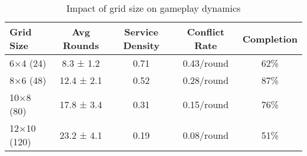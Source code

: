 \begin{table}[h]
\centering
\caption{Impact of grid size on gameplay dynamics}
\label{tab:gridsize}
\begin{tabular}{@{}lcccc@{}}
\toprule
Grid Size & Avg Rounds & Service Density & Conflict Rate & Completion \\
\midrule
6×4 (24) & 8.3 ± 1.2 & 0.71 & 0.43/round & 62\% \\
8×6 (48) & 12.4 ± 2.1 & 0.52 & 0.28/round & 87\% \\
10×8 (80) & 17.8 ± 3.4 & 0.31 & 0.15/round & 76\% \\
12×10 (120) & 23.2 ± 4.1 & 0.19 & 0.08/round & 51\% \\
\bottomrule
\end{tabular}
\end{table}